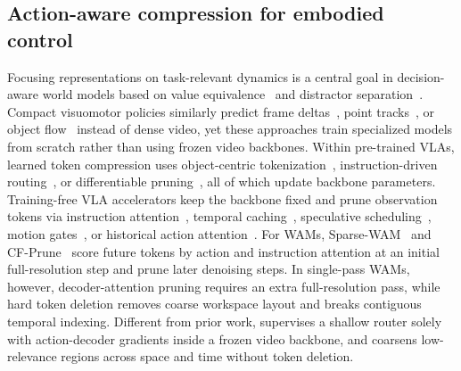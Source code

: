 


\subsection{Action-aware compression for embodied control}
\label{sec:related_tokens}
    Focusing representations on task-relevant dynamics is a central goal in decision-aware world models based on value equivalence~\cite{grimm2020valueequivalence,schrittwieser2020muzero} and distractor separation~\cite{fu2021tia,wang2022denoisedmdp,pan2022isodream}. 
    Compact visuomotor policies similarly predict frame deltas~\cite{micheli2024deltairis}, point tracks~\cite{wen2024atm,bharadhwaj2024track2act}, or object flow~\cite{xu2024im2flow2act} instead of dense video, yet these approaches train specialized models from scratch rather than using frozen video backbones.
    Within pre-trained VLAs, learned token compression uses object-centric tokenization~\cite{bendikas2025oatvla}, instruction-driven routing~\cite{li2025cogvla}, or differentiable pruning~\cite{brohan2023rt1,jiang2025lightvla}, all of which update backbone parameters.
    Training-free VLA accelerators keep the backbone fixed and prune observation tokens via instruction attention~\cite{yang2025efficientvla}, temporal caching~\cite{xu2025vlacache,tan2025flashvla}, speculative scheduling~\cite{li2025spvla,wang2026specprune}, motion gates~\cite{pei2026adp}, or historical action attention~\cite{liu2025vlapruner}.
    For WAMs, Sparse-WAM~\cite{xie2026sparsewam} and CF-Prune~\cite{kim2026cfprune} score future tokens by action and instruction attention at an initial full-resolution step and prune later denoising steps.
    In single-pass WAMs, however, decoder-attention pruning requires an extra full-resolution pass, while hard token deletion removes coarse workspace layout and breaks contiguous temporal indexing.
    Different from prior work, \method supervises a shallow router solely with action-decoder gradients inside a frozen video backbone, and coarsens low-relevance regions across space and time without token deletion.


